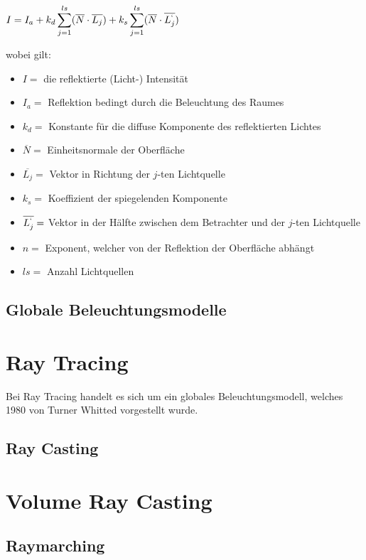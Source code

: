 $ I = I_a + k_d \displaystyle\sum_{j=1}^{ls} (\overline{N} \cdot \overline{L_j}) + k_s \displaystyle\sum_{j=1}^{ls} (\overline{N} \cdot \overline{L_j^`} ) $

wobei gilt:

\begin{itemize}
    \item $I =$ die reflektierte (Licht-) Intensität
    \item $I_a =$ Reflektion bedingt durch die Beleuchtung des Raumes
    \item $k_d =$ Konstante für die diffuse Komponente des reflektierten Lichtes
    \item $\overline{N} =$ Einheitsnormale der Oberfläche
    \item $\overline{L_j} =$ Vektor in Richtung der $j$-ten Lichtquelle
    \item $k_s =$ Koeffizient der spiegelenden Komponente
    \item $\overline{L_j^`} =$ Vektor in der Hälfte zwischen dem Betrachter und der $j$-ten Lichtquelle
    \item $n =$ Exponent, welcher von der Reflektion der Oberfläche abhängt
    \item $ls = $ Anzahl Lichtquellen
\end{itemize}

\subsection{Globale Beleuchtungsmodelle}
\label{subsec:global_illumination_models}


\section{Ray Tracing}
\label{sec:ray_tracing}

Bei Ray Tracing handelt es sich um ein globales Beleuchtungsmodell, welches 1980 von Turner Whitted vorgestellt wurde.

\subsection{Ray Casting}
\label{subsec:ray_casting}


\section{Volume Ray Casting}
\label{sec:volume_ray_casting}


\subsection{Raymarching}
\label{subsec:raymarching}

